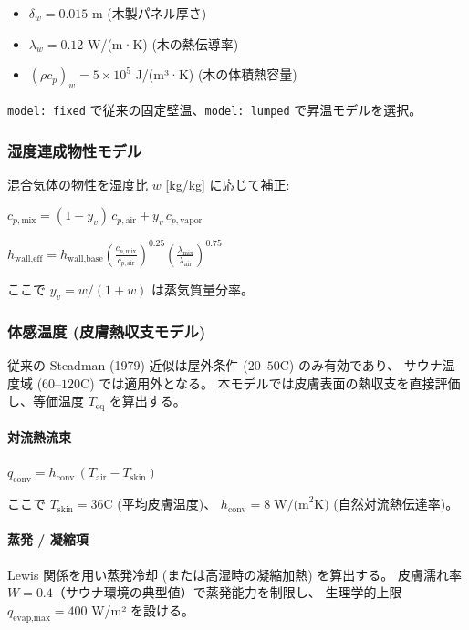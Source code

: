 \documentclass[a4paper,11pt]{article}
\begin{document}
\begin{itemize} \item $\delta_w = 0.015$ m (木製パネル厚さ) \end{itemize}
\begin{itemize} \item $\lambda_w = 0.12$ W/(m·K) (木の熱伝導率) \end{itemize}
\begin{itemize} \item $(\rho c_p)_w = 5 \times 10^5$ J/(m³·K) (木の体積熱容量) \end{itemize}

\texttt{model: fixed} で従来の固定壁温、\texttt{model: lumped} で昇温モデルを選択。

\subsubsection{湿度連成物性モデル}

混合気体の物性を湿度比 $w$ [kg/kg] に応じて補正:

$
c_{p,\text{mix}} = (1 - y_v) \, c_{p,\text{air}} + y_v \, c_{p,\text{vapor}}
$

$
h_{\text{wall,eff}} = h_{\text{wall,base}} \left(\frac{c_{p,\text{mix}}}{c_{p,\text{air}}}\right)^{0.25} \left(\frac{\lambda_{\text{mix}}}{\lambda_{\text{air}}}\right)^{0.75}
$

ここで $y_v = w / (1+w)$ は蒸気質量分率。

\subsubsection{体感温度 (皮膚熱収支モデル)}

従来の Steadman (1979) 近似は屋外条件 ($20$--$50$\textdegree C) のみ有効であり、
サウナ温度域 ($60$--$120$\textdegree C) では適用外となる。
本モデルでは皮膚表面の熱収支を直接評価し、等価温度 $T_{\text{eq}}$ を算出する。

\paragraph{対流熱流束}
$
q_{\text{conv}} = h_{\text{conv}} \, (T_{\text{air}} - T_{\text{skin}})
$

ここで $T_{\text{skin}} = 36$\textdegree C (平均皮膚温度)、
$h_{\text{conv}} = 8 \; \text{W/(m}^2\text{K)}$ (自然対流熱伝達率)。

\paragraph{蒸発 / 凝縮項}
Lewis 関係を用い蒸発冷却 (または高湿時の凝縮加熱) を算出する。
皮膚濡れ率 $W = 0.4$（サウナ環境の典型値）で蒸発能力を制限し、
生理学的上限 $q_{\text{evap,max}} = 400$ W/m² を設ける。
\end{document}

